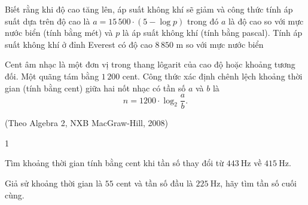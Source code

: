 \begin{ex}%
	Biết rằng khi độ cao tăng lên, áp suất không khí sẽ giảm và công thức tính áp suất dựa trên độ cao là $a=15\,500\cdot(5-\log p)$ trong đó $a$ là độ cao so với mực nước biển (tính bằng mét) và $p$ là áp suất không khí (tính bằng pascal). Tính áp suất không khí  ở đỉnh Everest có độ cao $8\,850$ m so với mực nước biển
\end{ex}

\begin{bt}%

	Cent âm nhạc là một đơn vị trong thang lôgarit của cao độ hoặc khoảng tương đối. Một quãng tám bằng $ 1\,200 $ cent. Công thức xác định chênh lệch khoảng thời gian (tính bằng cent) giữa hai nốt nhạc có tần số $a$ và $b$ là
	$$n=1200 \cdot \log_2 \dfrac{a}{b}.$$
\begin{flushright}
	(Theo Algebra 2, NXB MacGraw-Hill, 2008)
\end{flushright}
	\begin{enumEX}{1}
		\item Tìm khoảng thời gian tính bằng cent khi tần số thay đổi từ $443 \mathrm{~Hz}$ về $415 \mathrm{~Hz}$.
		\item Giả sử khoảng thời gian là $ 55 $ cent và tần số đầu là $225 \mathrm{~Hz}$, hãy tìm tần số cuối cùng.
	\end{enumEX}
\end{bt}

